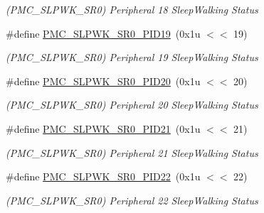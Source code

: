 \begin{DoxyCompactItemize}
\begin{DoxyCompactList}\small\item\em (P\+M\+C\+\_\+\+S\+L\+P\+W\+K\+\_\+\+S\+R0) Peripheral 18 Sleep\+Walking Status \end{DoxyCompactList}\item 
\mbox{\label{group__SAMS70__PMC_ga9fcc0ae06dfed9fc15d2e33f7e4ca0da}} 
\#define \mbox{\hyperlink{group__SAMS70__PMC_ga9fcc0ae06dfed9fc15d2e33f7e4ca0da}{P\+M\+C\+\_\+\+S\+L\+P\+W\+K\+\_\+\+S\+R0\+\_\+\+P\+I\+D19}}~(0x1u $<$$<$ 19)
\begin{DoxyCompactList}\small\item\em (P\+M\+C\+\_\+\+S\+L\+P\+W\+K\+\_\+\+S\+R0) Peripheral 19 Sleep\+Walking Status \end{DoxyCompactList}\item 
\mbox{\label{group__SAMS70__PMC_gaf4e8c136943976671775a545e578f501}} 
\#define \mbox{\hyperlink{group__SAMS70__PMC_gaf4e8c136943976671775a545e578f501}{P\+M\+C\+\_\+\+S\+L\+P\+W\+K\+\_\+\+S\+R0\+\_\+\+P\+I\+D20}}~(0x1u $<$$<$ 20)
\begin{DoxyCompactList}\small\item\em (P\+M\+C\+\_\+\+S\+L\+P\+W\+K\+\_\+\+S\+R0) Peripheral 20 Sleep\+Walking Status \end{DoxyCompactList}\item 
\mbox{\label{group__SAMS70__PMC_ga4c4c2814c433de0b3ae83e8cd1aa08c6}} 
\#define \mbox{\hyperlink{group__SAMS70__PMC_ga4c4c2814c433de0b3ae83e8cd1aa08c6}{P\+M\+C\+\_\+\+S\+L\+P\+W\+K\+\_\+\+S\+R0\+\_\+\+P\+I\+D21}}~(0x1u $<$$<$ 21)
\begin{DoxyCompactList}\small\item\em (P\+M\+C\+\_\+\+S\+L\+P\+W\+K\+\_\+\+S\+R0) Peripheral 21 Sleep\+Walking Status \end{DoxyCompactList}\item 
\mbox{\label{group__SAMS70__PMC_gaa5f77da184e5175a64fd9dd93e0adc7b}} 
\#define \mbox{\hyperlink{group__SAMS70__PMC_gaa5f77da184e5175a64fd9dd93e0adc7b}{P\+M\+C\+\_\+\+S\+L\+P\+W\+K\+\_\+\+S\+R0\+\_\+\+P\+I\+D22}}~(0x1u $<$$<$ 22)
\begin{DoxyCompactList}\small\item\em (P\+M\+C\+\_\+\+S\+L\+P\+W\+K\+\_\+\+S\+R0) Peripheral 22 Sleep\+Walking Status \end{DoxyCompactList}\item 

\end{DoxyCompactItemize}
